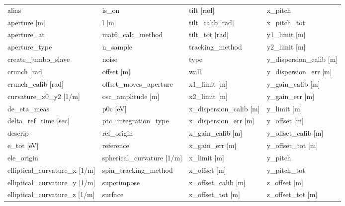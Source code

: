  \begin{tabular}{llll} \toprule
alias                            & is_on                            & tilt [rad]                       & x_pitch                          \\
aperture [m]                     & l [m]                            & tilt_calib [rad]                 & x_pitch_tot                      \\
aperture_at                      & mat6_calc_method                 & tilt_tot [rad]                   & y1_limit [m]                     \\
aperture_type                    & n_sample                         & tracking_method                  & y2_limit [m]                     \\
create_jumbo_slave               & noise                            & type                             & y_dispersion_calib [m]           \\
crunch [rad]                     & offset [m]                       & wall                             & y_dispersion_err [m]             \\
crunch_calib [rad]               & offset_moves_aperture            & x1_limit [m]                     & y_gain_calib [m]                 \\
curvature_x0_y2 [1/m]            & osc_amplitude [m]                & x2_limit [m]                     & y_gain_err [m]                   \\
de_eta_meas                      & p0c [eV]                         & x_dispersion_calib [m]           & y_limit [m]                      \\
delta_ref_time [sec]             & ptc_integration_type             & x_dispersion_err [m]             & y_offset [m]                     \\
descrip                          & ref_origin                       & x_gain_calib [m]                 & y_offset_calib [m]               \\
e_tot [eV]                       & reference                        & x_gain_err [m]                   & y_offset_tot [m]                 \\
ele_origin                       & spherical_curvature [1/m]        & x_limit [m]                      & y_pitch                          \\
elliptical_curvature_x [1/m]     & spin_tracking_method             & x_offset [m]                     & y_pitch_tot                      \\
elliptical_curvature_y [1/m]     & superimpose                      & x_offset_calib [m]               & z_offset [m]                     \\
elliptical_curvature_z [1/m]     & surface                          & x_offset_tot [m]                 & z_offset_tot [m]                 \\
 \bottomrule
 \end{tabular}
 \vfill
 
